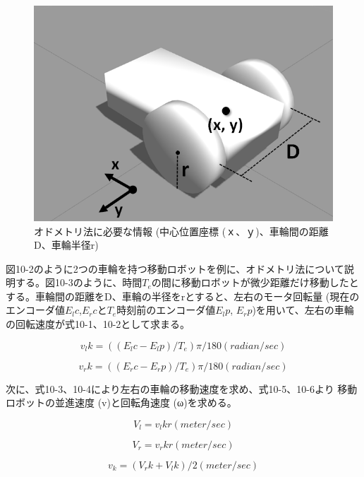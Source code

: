 \begin{figure}[ht]
  \centering
  \includegraphics[width=\columnwidth]{pictures/chapter10/pic_10_02.png}
  \caption{オドメトリ法に必要な情報 (中心位置座標 (ｘ、ｙ)、車輪間の距離D、車輪半径r)}
\end{figure}

図10-2のように2つの車輪を持つ移動ロボットを例に、オドメトリ法について説明する。図10-3のように、時間$T_e$の間に移動ロボットが微少距離だけ移動したとする。車輪間の距離をD、車輪の半径をrとすると、左右のモータ回転量 (現在のエンコーダ値$E_lc$,$E_rc$と$T_e$時刻前のエンコーダ値$E_lp$, $E_rp$)を用いて、左右の車輪の回転速度が式10-1、10-2として求まる。

\begin{equation}
v_lk = ((E_lc-E_lp)/T_e) π/180     (radian/sec)
\end{equation}

\begin{equation}
v_rk = ((E_rc-E_rp)/T_e)π/180     (radian/sec)
\end{equation}

次に、式10-3、10-4により左右の車輪の移動速度を求め、式10-5、10-6より   移動ロボットの並進速度 (v)と回転角速度 (ω)を求める。

\begin{equation}
V_l = v_lk r     (meter/sec)
\end{equation}

\begin{equation}
V_r = v_rk r     (meter/sec)
\end{equation}

\begin{equation}
v_k = (V_rk+V_lk)/2     (meter/sec)
\end{equation}

